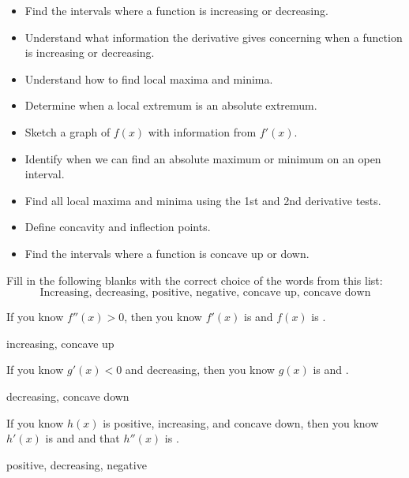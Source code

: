 \documentclass[handout,nooutcomes]{ximera}
\renewenvironment{freeResponse}{
\ifhandout\setbox0\vbox\bgroup\else
\begin{trivlist}\item[\hskip \labelsep\bfseries Solution:\hspace{2ex}]
\fi}
{\ifhandout\egroup\else
\end{trivlist}
\fi}
\begin{document}
\begin{itemize}
  \item 
    Find the intervals where a function is increasing or decreasing.
  \item
    Understand what information the derivative gives concerning when a function is increasing or decreasing.
  \item
    Understand how to find local maxima and minima.
  \item
    Determine when a local extremum is an absolute extremum.
  \item
    Sketch a graph of $f(x)$ with information from $f'(x)$.
  \item
    Identify when we can find an absolute maximum or minimum on an open interval. 
  \item
    Find all local maxima and minima using the 1st and 2nd derivative tests.
  \item
    Define concavity and inflection points. 
  \item
    Find the intervals where a function is concave up or down.
\end{itemize}
\newpage
\begin{problem}
  Fill in the following blanks with the correct choice of the words
  from this list:
$$ \text{Increasing, decreasing, positive, negative, concave up, concave down} $$

\begin{enumerate}
	
\item If you know $f''(x) > 0$, then you know $f'(x)$ is
  \underline{\hspace{3cm}} and $f(x)$ is \underline{\hspace{3cm}}.
  \begin{freeResponse}
    increasing, concave up
  \end{freeResponse}
		
			
				
\item If you know $g'(x) < 0$ and decreasing, then you know $g(x)$ is
  \underline{\hspace{3cm}} and \underline{\hspace{3cm}}.
  \begin{freeResponse}
    decreasing, concave down
  \end{freeResponse}
		
			
				
\item If you know $h(x)$ is positive, increasing, and concave down,
  then you know $h'(x)$ is \underline{\hspace{3cm}} and
  \underline{\hspace{3cm}} and that $h''(x)$ is
  \underline{\hspace{3cm}}.
  \begin{freeResponse}
    positive, decreasing, negative
  \end{freeResponse}
			
\end{enumerate}
\end{problem}
\end{document}
